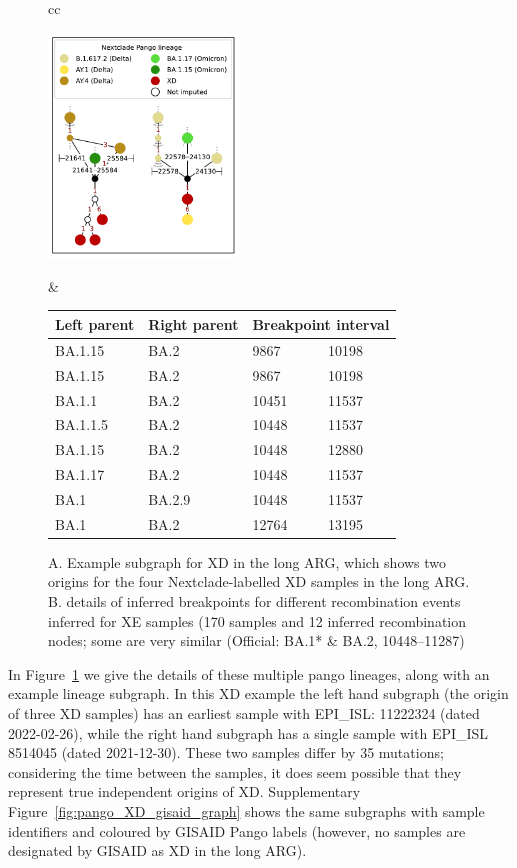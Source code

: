 \documentclass{article}
\begin{document}
\begin{figure}
\begin{tabular}{cc}

\includegraphics[width=0.45\textwidth]{figures/Pango_XD_nxcld_tight_graph.pdf}

 &

\begin{tabular}{llll}
\toprule
Left parent & Right parent & \multicolumn{2}{l}{Breakpoint interval}\\
\midrule
BA.1.15 & BA.2  &9867  &10198\\
BA.1.15 & BA.2  &9867  &10198\\
BA.1.1  &BA.2  &10451  &11537\\
BA.1.1.5 & BA.2 &10448 & 11537\\
BA.1.15 & BA.2  &10448  &12880\\
BA.1.17 & BA.2  &10448 & 11537\\
BA.1  &BA.2.9  &10448 & 11537\\
BA.1  &BA.2  &12764  &13195\\
\bottomrule
\end{tabular}
\end{tabular}
\caption{\label{fig:multiple_origins_graph}
A. Example subgraph for XD in the long ARG, which shows two origins for the
four Nextclade-labelled XD samples in the long ARG. B. details of inferred
breakpoints for different recombination events inferred for XE samples (170
samples and 12 inferred recombination nodes; some are very similar (Official:
BA.1* \& BA.2, 10448–11287)}
\end{figure}

In Figure~\ref{fig:multiple_origins_graph} we give the details of these
multiple pango lineages, along with an example lineage subgraph. In this XD
example the left hand subgraph (the origin of three XD samples) has an earliest
sample with EPI\_ISL: 11222324 (dated 2022-02-26), while the right hand
subgraph has a single sample with EPI\_ISL 8514045 (dated 2021-12-30). These
two samples differ by 35 mutations; considering the time between the samples,
it does seem possible that they represent true independent origins of XD.
Supplementary Figure~\ref{fig:pango_XD_gisaid_graph} shows the same subgraphs
with sample identifiers and coloured by GISAID Pango labels (however, no
samples are designated by GISAID as XD in the long ARG).
\end{document}
